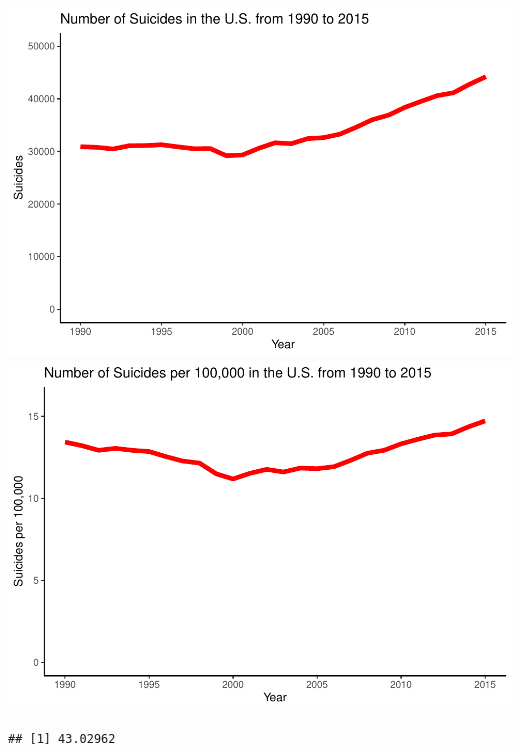 \documentclass[11pt,]{article}
\begin{document}
\includegraphics{An-Analysis-of-Suicide-Data_files/figure-latex/unnamed-chunk-1-1.pdf}
\includegraphics{An-Analysis-of-Suicide-Data_files/figure-latex/unnamed-chunk-1-2.pdf}

\begin{verbatim}
## [1] 43.02962
\end{verbatim}
\end{document}
